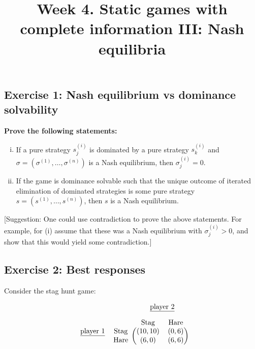 \documentclass[10pt]{article}
\title{\textbf{Week 4.} Static games with complete information III: Nash equilibria}
\date{}
\begin{document}
\maketitle
\vspace{-1cm}

\subsection*{Exercise 1: Nash equilibrium vs dominance solvability}

\textbf{Prove the following statements:}

\begin{enumerate}[(i)]
    \item If a pure strategy \(s^{(i)}_{j}\) is dominated by a pure strategy \(s^{(i)}_{k}\) and
    \(\sigma = (\sigma^{(1)}, \dots, \sigma^{(n)})\) is a Nash equilibrium, then
    \(\sigma^{(i)}_{j}=0\).
    \item If the game is dominance solvable such that the unique outcome of
    iterated elimination of dominated strategies is some pure strategy
    \(s=(s^{(1)}, \dots, s^{(n)})\), then \(s\) is a Nash equilibrium.
\end{enumerate}

[Suggestion: One could use contradiction to prove the above statements. For example, for (i)
assume that these was a Nash equilibrium with \(\sigma^{(i)}_{j}>0\), and show
that this would yield some contradiction.]

\subsection*{Exercise 2: Best responses}

Consider the stag hunt game:

\begin{equation*}
    \begin{blockarray}{cccc}
       & & \BAmulticolumn{2}{c}{\underline{\text{player 2}}} \\ [1em]
       & & \text{Stag} & \text{Hare} \\
        \begin{block}{cc(cc)}
\underline{\text{player 1}} & \text{Stag} & (10, 10) & (0, 6) \\
                            & \text{Hare} & (6, 0) & (6, 6) \\
        \end{block}
    \end{blockarray}
\end{equation*}
\end{document}
